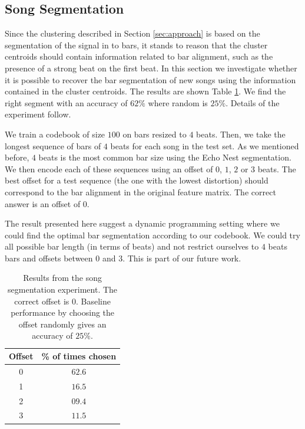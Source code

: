 \documentclass{article}
\begin{document}
\subsection{Song Segmentation} \label{ssec:segment}

Since the clustering described in Section \ref{sec:approach} is based
on the segmentation of the signal in to bars, it stands to reason that
the cluster centroids should contain information related to bar
alignment, such as the presence of a strong beat on the first beat.
%
In this section we investigate whether it is possible to recover the
bar segmentation of new songs using the information contained in the
cluster centroids.  The results are shown Table \ref{tab:offset}. We find
the right segment with an accuracy of $62\%$ where random is
$25\%$. Details of the experiment follow.

We train a codebook of size $100$ on bars resized to $4$ beats. Then,
we take the longest sequence of bars of $4$ beats for each song
in the test set.  As
we mentioned before, $4$ beats is the most common bar size using the
Echo Nest segmentation. We then encode each of these sequences using an offset
of $0$, $1$, $2$ or $3$ beats. The best offset for a test sequence
(the one with the lowest distortion)
should correspond to the bar alignment in the original
feature matrix.  The correct answer is an offset of $0$.


The result presented here suggest a dynamic programming setting where
we could find the optimal bar segmentation according to our codebook. 
We could try
all possible bar length (in terms of beats) and not restrict ourselves
to $4$ beats bars and offsets between $0$ and $3$. This is part of
our future work.

\begin{table}
\begin{center}
\begin{tabular}{cc}
\toprule
Offset & \% of times chosen \\
\midrule
0 & $\mathbf{62.6}$\\
1 & $16.5$\\
2 & $09.4$\\
3 & $11.5$\\
\bottomrule
\end{tabular}
\end{center}
\caption{\small{
Results from the song segmentation experiment.
The correct offset is $0$.
Baseline performance by choosing the offset randomly gives an accuracy of $25$\%.
}}
\label{tab:offset}
\end{table}
\end{document}
